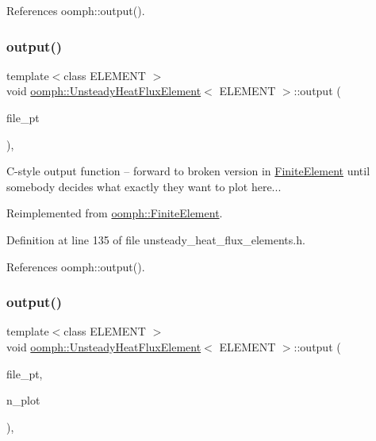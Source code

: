 References oomph\+::output().

\mbox{\label{classoomph_1_1UnsteadyHeatFluxElement_a96ad3606e27ea00fc36c9ceb1cb9986b}} 
\subsubsection{\texorpdfstring{output()}{output()}\hspace{0.1cm}{\footnotesize\ttfamily [3/4]}}
{\footnotesize\ttfamily template$<$class E\+L\+E\+M\+E\+NT $>$ \\
void \hyperlink{classoomph_1_1UnsteadyHeatFluxElement}{oomph\+::\+Unsteady\+Heat\+Flux\+Element}$<$ E\+L\+E\+M\+E\+NT $>$\+::output (\begin{DoxyParamCaption}\item[{F\+I\+LE $\ast$}]{file\+\_\+pt }\end{DoxyParamCaption})\hspace{0.3cm}{\ttfamily [inline]}, {\ttfamily [virtual]}}

C-\/style output function -- forward to broken version in \hyperlink{classoomph_1_1FiniteElement}{Finite\+Element} until somebody decides what exactly they want to plot here... 

Reimplemented from \hyperlink{classoomph_1_1FiniteElement_a72cddd09f8ddbee1a20a1ff404c6943e}{oomph\+::\+Finite\+Element}.



Definition at line 135 of file unsteady\+\_\+heat\+\_\+flux\+\_\+elements.\+h.



References oomph\+::output().

\mbox{\label{classoomph_1_1UnsteadyHeatFluxElement_aadaff4b6890b01fb9081408d69806b52}} 
\subsubsection{\texorpdfstring{output()}{output()}\hspace{0.1cm}{\footnotesize\ttfamily [4/4]}}
{\footnotesize\ttfamily template$<$class E\+L\+E\+M\+E\+NT $>$ \\
void \hyperlink{classoomph_1_1UnsteadyHeatFluxElement}{oomph\+::\+Unsteady\+Heat\+Flux\+Element}$<$ E\+L\+E\+M\+E\+NT $>$\+::output (\begin{DoxyParamCaption}\item[{F\+I\+LE $\ast$}]{file\+\_\+pt,  }\item[{const unsigned \&}]{n\+\_\+plot }\end{DoxyParamCaption})\hspace{0.3cm}{\ttfamily [inline]}, {\ttfamily [virtual]}}



